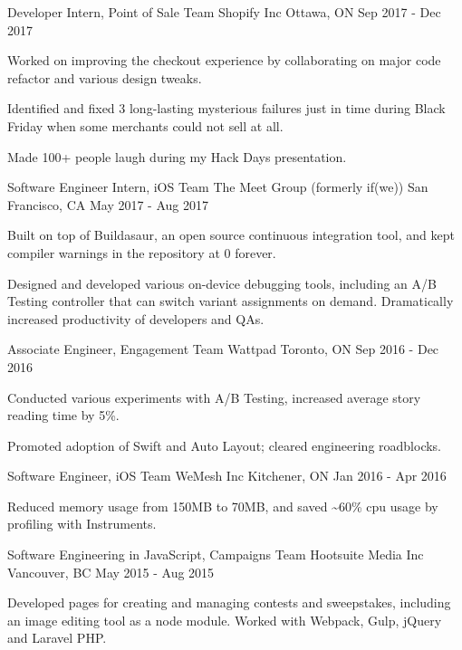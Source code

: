 \begin{cventries}
  \cventry
    {Developer Intern, Point of Sale Team}
    {Shopify Inc}
    {Ottawa, ON}
    {Sep 2017 - Dec 2017}
    {
      \begin{cvitems}
        \item {Worked on improving the checkout experience by collaborating on major code refactor and various design tweaks.}
        \item {Identified and fixed 3 long-lasting mysterious failures just in time during Black Friday when some merchants could not sell at all.}
        \item {Made 100+ people laugh during my Hack Days presentation.}
      \end{cvitems}
    }
  \cventry
    {Software Engineer Intern, iOS Team}
    {The Meet Group (formerly if(we))}
    {San Francisco, CA}
    {May 2017 - Aug 2017}
    {
      \begin{cvitems}
        \item {Built on top of Buildasaur, an open source continuous integration tool, and kept compiler warnings in the repository at 0 forever.}
        \item {Designed and developed various on-device debugging tools, including an A/B Testing controller that can switch variant assignments on demand. Dramatically increased productivity of developers and QAs.}
      \end{cvitems}
    }
  \cventry
    {Associate Engineer, Engagement Team}
    {Wattpad}
    {Toronto, ON}
    {Sep 2016 - Dec 2016}
    {
      \begin{cvitems}
        \item {Conducted various experiments with A/B Testing, increased average story reading time by 5\%.}
        \item {Promoted adoption of Swift and Auto Layout; cleared engineering roadblocks.}
      \end{cvitems} 
    }
  \cventry
    {Software Engineer, iOS Team}
    {WeMesh Inc}
    {Kitchener, ON}
    {Jan 2016 - Apr 2016}
    {
      \begin{cvitems}
        \item {Reduced memory usage from 150MB to 70MB, and saved \textasciitilde60\% cpu usage by profiling with Instruments.}
      \end{cvitems}
    }
  \cventry
    {Software Engineering in JavaScript, Campaigns Team}
    {Hootsuite Media Inc}
    {Vancouver, BC}
    {May 2015 - Aug 2015}
    {
      \begin{cvitems}
        \item {Developed pages for creating and managing contests and sweepstakes, including an image editing tool as a node module. Worked with Webpack, Gulp, jQuery and Laravel PHP. }
      \end{cvitems}
    }
\end{cventries}
